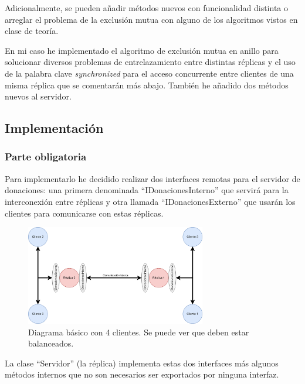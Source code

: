 \documentclass{article}
\begin{document}
Adicionalmente, se pueden añadir métodos nuevos con funcionalidad distinta o arreglar el problema de la exclusión mutua con alguno de los algoritmos vistos en clase de teoría.

En mi caso he implementado el algoritmo de exclusión mutua en anillo para solucionar diversos problemas de entrelazamiento entre distintas réplicas y el uso de la palabra clave \textit{synchronized} para el acceso concurrente entre clientes de una misma réplica que se comentarán más abajo. También he añadido dos métodos nuevos al servidor.
\subsection{Implementación}
\subsubsection{Parte obligatoria}

Para implementarlo he decidido realizar dos interfaces remotas para el servidor de donaciones: una primera denominada ``IDonacionesInterno'' que servirá para la interconexión entre réplicas y otra llamada ``IDonacionesExterno'' que usarán los clientes para comunicarse con estas réplicas.


\begin{figure}[H]
    \centering
    \includegraphics[width=0.7\textwidth]{imagenes/Parte 2 basico.png}
    \caption{Diagrama básico con 4 clientes. Se puede ver que deben estar balanceados.}
\end{figure}


La clase ``Servidor'' (la réplica) implementa estas dos interfaces más algunos métodos internos que no son necesarios ser exportados por ninguna interfaz.
\end{document}
